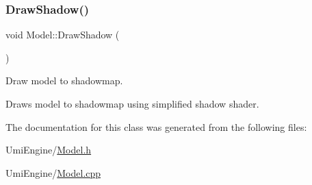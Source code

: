 \subsubsection{\texorpdfstring{DrawShadow()}{DrawShadow()}}
{\footnotesize\ttfamily void Model\+::\+Draw\+Shadow (\begin{DoxyParamCaption}{ }\end{DoxyParamCaption})}



Draw model to shadowmap. 

Draws model to shadowmap using simplified shadow shader. 

The documentation for this class was generated from the following files\+:\begin{DoxyCompactItemize}
\item 
Umi\+Engine/\mbox{\hyperlink{_model_8h}{Model.\+h}}\item 
Umi\+Engine/\mbox{\hyperlink{_model_8cpp}{Model.\+cpp}}\end{DoxyCompactItemize}
